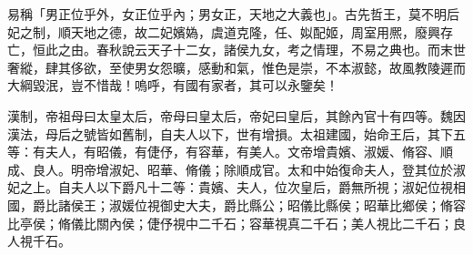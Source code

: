 \begin{pinyinscope}
 
 
 易稱「男正位乎外，女正位乎內；男女正，天地之大義也」。古先哲王，莫不明后妃之制，順天地之德，故二妃嬪媯，虞道克隆，任、姒配姬，周室用熈，廢興存亡，恒此之由。春秋說云天子十二女，諸侯九女，考之情理，不易之典也。而末世奢縱，肆其侈欲，至使男女怨曠，感動和氣，惟色是崇，不本淑懿，故風教陵遲而大綱毀泯，豈不惜哉！嗚呼，有國有家者，其可以永鑒矣！
 
 
 
 
 漢制，帝祖母曰太皇太后，帝母曰皇太后，帝妃曰皇后，其餘內官十有四等。魏因漢法，母后之號皆如舊制，自夫人以下，世有增損。太祖建國，始命王后，其下五等：有夫人，有昭儀，有倢伃，有容華，有美人。文帝增貴嬪、淑媛、脩容、順成、良人。明帝增淑妃、昭華、脩儀；除順成官。太和中始復命夫人，登其位於淑妃之上。自夫人以下爵凡十二等：貴嬪、夫人，位次皇后，爵無所視；淑妃位視相國，爵比諸侯王；淑媛位視御史大夫，爵比縣公；昭儀比縣侯；昭華比鄉侯；脩容比亭侯；脩儀比關內侯；倢伃視中二千石；容華視真二千石；美人視比二千石；良人視千石。
 
 
\end{pinyinscope}
